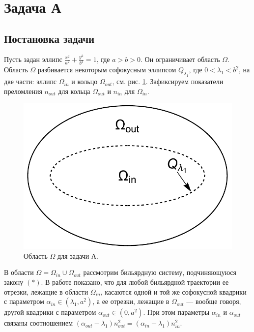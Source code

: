 \section{Задача А}\label{sec:ch4/sec2}
\subsection{Постановка задачи}\label{sec:ch4/sec2/subsec1}
Пусть задан эллипс $\frac{x^2}{a^2} + \frac{y^2}{b^2} =1$, где $a > b>0$. 
Он ограничивает область $\Omega$.
Область $\Omega$ разбивается некоторым софокусным эллипсом $Q_{\lambda_1}$, где $0 < \lambda_1 < b^2$, на две части: эллипс $\Omega_{in}$ и кольцо $\Omega_{out}$, см. рис. \ref{fig:pt9:_problemA}. Зафиксируем показатели преломления $n_{out}$ для кольца $\Omega_{out}$ и $n_{in}$ для $\Omega_{in}$.

\begin{figure}[!htb]
\centering
\includegraphics[scale=0.4]{images/ch4/section2/domain_problemA.pdf}
    \caption{Область $\Omega$ для задачи А.}
    \label{fig:pt9:_problemA}
\end{figure}

В области $\Omega = \Omega_{in} \cup \Omega_{out}$ рассмотрим бильярдную систему, подчиняющуюся закону $(\ast)$. В работе \cite{vestnikLatest} показано, что для любой бильярдной траектории ее отрезки, лежащие в области $\Omega_{in}$, касаются одной и той же  софокусной квадрики с параметром $\alpha_{in} \in (\lambda_1, a^2)$, а ее отрезки, лежащие в $\Omega_{out}$ --- вообще говоря, другой квадрики с параметром $\alpha_{out} \in (0, a^2)$. При этом параметры $\alpha_{in}$ и $\alpha_{out}$ связаны соотношением $(\alpha_{out} - \lambda_1) n_{out}^2 = (\alpha_{in} - \lambda_1) n_{in}^2$.

